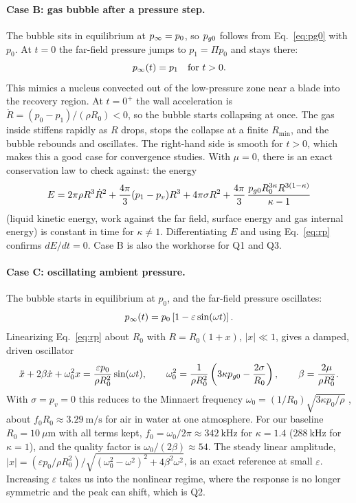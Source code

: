 \paragraph{Case B: gas bubble after a pressure step.} The bubble sits in equilibrium at
$p_\infty = p_0$, so $p_{g0}$ follows from Eq.~\eqref{eq:pg0} with $p_0$. At $t = 0$ the
far-field pressure jumps to $p_1 = \Pi p_0$ and stays there:
\begin{equation}
  p_\infty(t) = p_1 \quad \text{for } t > 0 .
\end{equation}
This mimics a nucleus convected out of the low-pressure zone near a blade into the recovery
region. At $t = 0^+$ the wall acceleration is $\ddot R = (p_0 - p_1)/(\rho R_0) < 0$, so the
bubble starts collapsing at once. The gas inside stiffens rapidly as $R$ drops, stops the
collapse at a finite $R_{\min}$, and the bubble rebounds and oscillates. The right-hand side
is smooth for $t > 0$, which makes this a good case for convergence studies. With
$\mu = 0$, there is an exact conservation law to check against: the energy
\begin{equation}\label{eq:energy}
  E = 2\pi\rho R^3\dot R^2 + \frac{4\pi}{3}(p_1 - p_v)R^3 + 4\pi\sigma R^2
      + \frac{4\pi}{3}\,\frac{p_{g0} R_0^{3\kappa} R^{3(1-\kappa)}}{\kappa - 1}
\end{equation}
(liquid kinetic energy, work against the far field, surface energy and gas internal energy)
is constant in time for $\kappa \ne 1$. Differentiating $E$ and using Eq.~\eqref{eq:rp}
confirms $dE/dt = 0$. Case B is also the workhorse for Q1 and Q3.

\paragraph{Case C: oscillating ambient pressure.} The bubble starts in equilibrium at $p_0$,
and the far-field pressure oscillates:
\begin{equation}
  p_\infty(t) = p_0\left[1 - \varepsilon\sin(\omega t)\right].
\end{equation}
Linearizing Eq.~\eqref{eq:rp} about $R_0$ with $R = R_0(1 + x)$, $|x| \ll 1$, gives a
damped, driven oscillator
\begin{equation}\label{eq:linear}
  \ddot x + 2\beta\dot x + \omega_0^2 x = \frac{\varepsilon p_0}{\rho R_0^2}\sin(\omega t),
  \qquad
  \omega_0^2 = \frac{1}{\rho R_0^2}\left(3\kappa p_{g0} - \frac{2\sigma}{R_0}\right),
  \qquad
  \beta = \frac{2\mu}{\rho R_0^2}.
\end{equation}
With $\sigma = p_v = 0$ this reduces to the Minnaert frequency
$\omega_0 = (1/R_0)\sqrt{3\kappa p_0/\rho}$ \cite{minnaert1933}, about
$f_0 R_0 \approx 3.29\ \mathrm{m/s}$ for air in water at one atmosphere. For our baseline
$R_0 = 10\ \mu\mathrm{m}$ with all terms kept, $f_0 = \omega_0/2\pi \approx 342\ \mathrm{kHz}$
for $\kappa = 1.4$ ($288\ \mathrm{kHz}$ for $\kappa = 1$), and the quality factor is
$\omega_0/(2\beta) \approx 54$. The steady linear amplitude,
$|x| = (\varepsilon p_0/\rho R_0^2)\big/\sqrt{(\omega_0^2 - \omega^2)^2 + 4\beta^2\omega^2}$,
is an exact reference at small $\varepsilon$. Increasing $\varepsilon$ takes us into the
nonlinear regime, where the response is no longer symmetric and the peak can shift, which is Q2.

